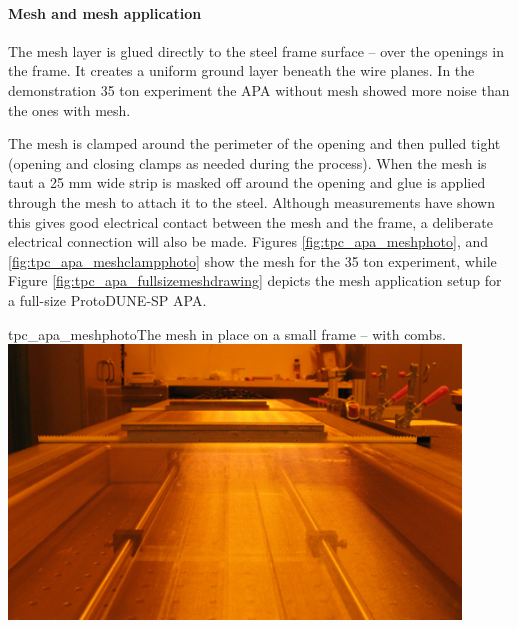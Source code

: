 \paragraph{Mesh and mesh application}

The mesh layer is glued directly to the steel frame surface -- over the openings in the frame.  It creates a uniform ground layer beneath the wire planes.  In the demonstration 35 ton experiment the APA without mesh showed more noise than the ones with mesh.

The mesh is clamped around the perimeter of the opening and then pulled tight (opening and closing clamps as needed during the process).  When the mesh is taut a 25 mm wide strip is masked off around the opening and glue is applied through the mesh to attach it to the steel.  Although measurements have shown this gives good electrical contact between the mesh and the frame, a deliberate electrical connection will also be made.  Figures \ref{fig:tpc_apa_meshphoto}, and \ref{fig:tpc_apa_meshclampphoto} show the mesh for the 35 ton experiment, while Figure \ref{fig:tpc_apa_fullsizemeshdrawing} depicts the mesh application setup for a full-size ProtoDUNE-SP APA.

\begin{cdrfigure}{tpc_apa_meshphoto}{The mesh in place on a small frame -- with combs.}
\includegraphics[width=0.9\textwidth]{figures/tpc_apa_meshphoto.png} 
\end{cdrfigure}

